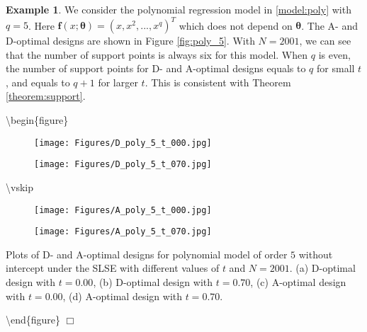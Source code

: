 \documentclass[
]{book}
\theoremstyle{definition}
\theoremstyle{definition}
\newtheorem{example}{Example}[chapter]
\theoremstyle{definition}
\theoremstyle{definition}
\theoremstyle{remark}
\begin{document}
\begin{example}
\protect\hypertarget{exm:polynomial}{}\label{exm:polynomial}We consider the polynomial regression model in \eqref{model:poly} with \(q=5\). Here \(\bm{f}(x;\bm{\theta}) = (x,x^2,... ,x^q)^T\) which does not depend on \(\mathbf{\theta}\). The A- and D-optimal designs are shown in Figure \ref{fig:poly_5}. With \(N=2001\), we can see that the number of support points is always six for this model. When \(q\) is even, the number of support points for D- and A-optimal designs equals to \(q\) for small \(t\), and equals to \(q+1\) for larger \(t\). This is consistent with Theorem \ref{theorem:support}.

\textbackslash begin\{figure\}
\centering

\begin{subfigure}[b]{0.475\textwidth}
            \centering
            \caption[]%
            {{\small}} 
            \texttt{[image: Figures/D\_poly\_5\_t\_000.jpg]}
        \end{subfigure}
        \hfill
        \begin{subfigure}[b]{0.475\textwidth}  
            \centering
            \caption[]%
            {{\small}} 
            \texttt{[image: Figures/D\_poly\_5\_t\_070.jpg]}
        \end{subfigure}

\textbackslash vskip\baselineskip

\begin{subfigure}[b]{0.475\textwidth}   
            \centering
            \caption[]%
            {{\small}} 
            \texttt{[image: Figures/A\_poly\_5\_t\_000.jpg]}
        \end{subfigure}
        \quad
        \begin{subfigure}[b]{0.475\textwidth}   
            \centering
            \caption[]%
            {{\small}} 
            \texttt{[image: Figures/A\_poly\_5\_t\_070.jpg]}
        \end{subfigure}
        \caption{Plots of D- and A-optimal designs for polynomial model of order $5$ without intercept under the SLSE with different values of $t$ and $N=2001$. (a) D-optimal design with $t = 0.00$, (b) D-optimal design with $t = 0.70$, (c) A-optimal design with $t = 0.00$, (d) A-optimal design with $t = 0.70$.}
        \label{fig:poly_5}

\textbackslash end\{figure\}
\hfill\(\Box\)
\end{example}
\end{document}
